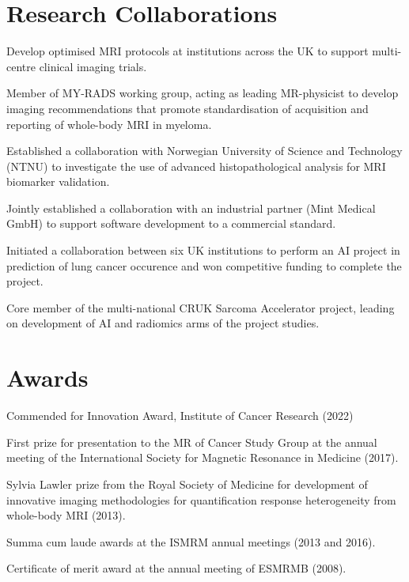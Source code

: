\documentclass[]{mbcv}
\begin{document}
\section{Research Collaborations}
\vspace*{10pt}
\begin{tightemize}
\item Develop optimised MRI protocols at institutions across the UK to support multi-centre clinical imaging trials.
\item Member of MY-RADS working group, acting as leading MR-physicist to develop imaging recommendations that promote standardisation of acquisition and reporting of whole-body MRI in myeloma.
\item Established a collaboration with Norwegian University of Science and Technology (NTNU) to investigate the use of advanced histopathological analysis for MRI biomarker validation.
\item Jointly established a collaboration with an industrial partner (Mint Medical GmbH) to support software development to a commercial standard.
\item Initiated a collaboration between six UK institutions to perform an AI project in prediction of lung cancer occurence and won competitive funding to complete the project.
\item Core member of the multi-national CRUK Sarcoma Accelerator project, leading on development of AI and radiomics arms of the project studies.
\end{tightemize}

\section{Awards}
\vspace*{10pt}
\begin{tightemize}
\item Commended for Innovation Award, Institute of Cancer Research (2022)
\item First prize for presentation to the MR of Cancer Study Group at the annual meeting of the International Society for Magnetic Resonance in Medicine (2017). 
\item Sylvia Lawler prize from the Royal Society of Medicine for development of innovative imaging methodologies for quantification response heterogeneity from whole-body MRI (2013).
\item Summa cum laude awards at the ISMRM annual meetings (2013 and 2016).
\item Certificate of merit award at the annual meeting of ESMRMB (2008).
\end{tightemize}
\end{document}
